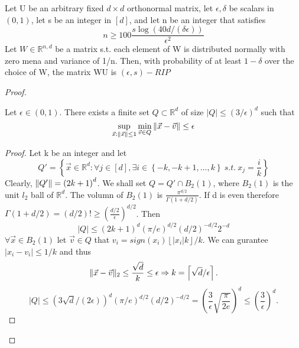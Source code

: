 \begin{theorem}
    Let U be an arbitrary fixed $ d\times d $ orthonormal matrix, let $ \epsilon, \delta $ be scalars in $ (0,1) $, let s be an integer in $ [d] $, and let n be an integer that satisfies
    \[
        n \ge 100 \frac{s \log(40d / (\delta \epsilon))}{\epsilon^2} 
    \]
    Let $ W \in \mathbb{R}^{n,d} $ be a matrix {s.t.} each element of W is distributed normally with zero mena and variance of 1/n. Then, with probability of at least $ 1 - \delta $ over the choice of W, the matrix WU is $ (\epsilon, s)-RIP $
    \begin{proof}
        \begin{lemma}
            Let $ \epsilon \in (0, 1) $. There exists a finite set $ Q \subset \mathbb{R}^{d} $ of size $ \left| Q \right| \le {(3/\epsilon)}^{d} $ such that
            \[
                \sup_{\vec{x}: \Arrowvert \vec{x} \Arrowvert \le 1} \min_{\vec{v} \in Q} \Arrowvert \vec{x} - \vec{v} \Arrowvert \le \epsilon
            \]
            \begin{proof}
                Let k be an integer and let
                \[
                    Q' = \left\{ \vec{x} \in \mathbb{R}^{d}: \forall j \in \left[ d \right], \exists i \in \left\{ -k, -k+1, \ldots, k \right\}\ s.t.\ x_j = \frac{i}{k}  \right\}
                \]
                Clearly, $ \Arrowvert Q' \Arrowvert = {(2k + 1)}^{d} $. We shall set $ Q = Q' \cap B_2(1) $, where $ B_{2}(1) $ is the unit $ l_2 $ ball of $ \mathbb{R}^{d} $. The volumn of $ B_2(1) $ is $ \frac{\pi^{d/2}}{\Gamma(1+d/2)}  $.
                If d is even therefore $ \Gamma(1+d/2) = (d/2)! \ge {(\frac{d/2}{\epsilon} )}^{d/2} $. Then
                \[
                    \left| Q \right| \le {(2k+1)}^{d} {(\pi / e)}^{d/2} {(d/2)}^{-d/2} 2^{-d}
                \]
                $ \forall \vec{x} \in B_2(1) $ let $ \vec{v} \in Q $ that $ v_i = sign(x_i)\left\lfloor \left| x_i \right| k \right\rfloor /k $. We can gurantee $ \left| x_i - v_i \right| \le 1/k $ and thus
                \[
                    \Arrowvert \vec{x} - \vec{v} \Arrowvert_2 \le \frac{\sqrt d}{k} \le \epsilon 
                    \Rightarrow k = \left\lceil \sqrt d / \epsilon \right\rceil.
                \]
                \[
                    \left| Q \right| \le {(3\sqrt d / (2\epsilon))}^d{(\pi / e)}^{d/2} {(d/2)}^{-d/2} = {\left( \frac{3}{\epsilon} \sqrt{\frac{\pi}{2e} }\right)}^{d}  \le {\left( \frac{3}{\epsilon}  \right)}^d.
                \]
            \end{proof}
        \end{lemma}

\end{proof}
\end{theorem}
